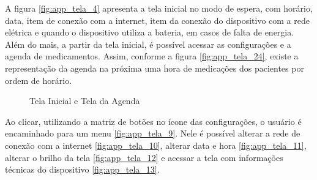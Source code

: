 \begin{apendicesenv}
A figura \ref{fig:app_tela_4} apresenta a tela inicial no modo de espera, com horário, data, item de conexão com a internet, item da conexão do dispositivo com a rede elétrica e quando o dispositivo utiliza a bateria, em casos de falta de energia. Além do mais, a partir da tela inicial, é possível acessar as configurações e a agenda de medicamentos. Assim, conforme a figura \ref{fig:app_tela_24}, existe a representação da agenda na próxima uma hora de medicações dos pacientes por ordem de horário.

\begin{figure}[H]
    \centering
    \caption{Tela Inicial e Tela da Agenda}\label{fig:telas_4_24}
\end{figure}

Ao clicar, utilizando a matriz de botões no ícone das configurações, o usuário é encaminhado para um menu \ref{fig:app_tela_9}. Nele é possível alterar a rede de conexão com a internet \ref{fig:app_tela_10}, alterar data e hora \ref{fig:app_tela_11}, alterar o brilho da tela \ref{fig:app_tela_12} e acessar a tela com informações técnicas do dispositivo \ref{fig:app_tela_13}.


\end{apendicesenv}
